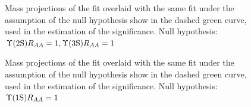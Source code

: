 \begin{figure}
\begin{center}
\caption{Mass projections of the fit overlaid with the same fit under the assumption of the null hypothesis show in the dashed green curve, used in the estimation of the significance. Null hypothesis: $\Upsilon\text{(2S)} R_{AA} = 1, \Upsilon\mathrm{(3S)} R_{AA} = 1$ }
\label{fig:raa_Y23sSignif}
\end{center}
\end{figure}

\begin{figure}
\begin{center}
\caption{Mass projections of the fit overlaid with the same fit under the assumption of the null hypothesis show in the dashed green curve, used in the estimation of the significance. Null hypothesis: $\Upsilon\text{(1S)} R_{AA} = 1$ }
\label{fig:raa_Y1sSignif}
\end{center}
\end{figure}

